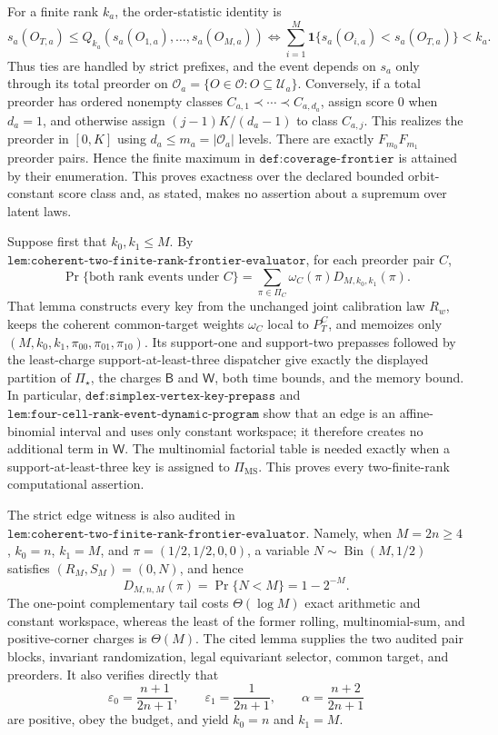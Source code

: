 For a finite rank \(k_a\), the order-statistic identity is
\[
s_a(O_{T,a})\le Q_{k_a}(s_a(O_{1,a}),\ldots,s_a(O_{M,a}))
\iff
\sum_{i=1}^M\mathbf 1\{s_a(O_{i,a})<s_a(O_{T,a})\}<k_a.
\tag{1}
\]
Thus ties are handled by strict prefixes, and the event depends on \(s_a\) only through its total preorder on \(\mathcal O_a=\{O\in\mathcal O:O\subseteq\mathcal U_a\}\). Conversely, if a total preorder has ordered nonempty classes \(C_{a,1}\prec\cdots\prec C_{a,d_a}\), assign score \(0\) when \(d_a=1\), and otherwise assign \((j-1)K/(d_a-1)\) to class \(C_{a,j}\). This realizes the preorder in \([0,K]\) using \(d_a\le m_a=|\mathcal O_a|\) levels. There are exactly \(F_{m_0}F_{m_1}\) preorder pairs. Hence the finite maximum in \(\texttt{def:coverage-frontier}\) is attained by their enumeration. This proves exactness over the declared bounded orbit-constant score class and, as stated, makes no assertion about a supremum over latent laws.

Suppose first that \(k_0,k_1\le M\). By \(\texttt{lem:coherent-two-finite-rank-frontier-evaluator}\), for each preorder pair \(C\),
\[
\Pr\{\text{both rank events under }C\}=\sum_{\pi\in\Pi_C}\omega_C(\pi)D_{M,k_0,k_1}(\pi).
\tag{2}
\]
That lemma constructs every key from the unchanged joint calibration law \(R_w\), keeps the coherent common-target weights \(\omega_C\) local to \(P_T^C\), and memoizes only \((M,k_0,k_1,\pi_{00},\pi_{01},\pi_{10})\). Its support-one and support-two prepasses followed by the least-charge support-at-least-three dispatcher give exactly the displayed partition of \(\Pi_\star\), the charges \(\mathsf B\) and \(\mathsf W\), both time bounds, and the memory bound. In particular, \(\texttt{def:simplex-vertex-key-prepass}\) and \(\texttt{lem:four-cell-rank-event-dynamic-program}\) show that an edge is an affine-binomial interval and uses only constant workspace; it therefore creates no additional term in \(\mathsf W\). The multinomial factorial table is needed exactly when a support-at-least-three key is assigned to \(\Pi_{\mathrm{MS}}\). This proves every two-finite-rank computational assertion.

The strict edge witness is also audited in \(\texttt{lem:coherent-two-finite-rank-frontier-evaluator}\). Namely, when \(M=2n\ge4\), \(k_0=n\), \(k_1=M\), and \(\pi=(1/2,1/2,0,0)\), a variable \(N\sim\operatorname{Bin}(M,1/2)\) satisfies \((R_M,S_M)=(0,N)\), and hence
\[
D_{M,n,M}(\pi)=\Pr\{N<M\}=1-2^{-M}.
\tag{3}
\]
The one-point complementary tail costs \(\Theta(\log M)\) exact arithmetic and constant workspace, whereas the least of the former rolling, multinomial-sum, and positive-corner charges is \(\Theta(M)\). The cited lemma supplies the two audited pair blocks, invariant randomization, legal equivariant selector, common target, and preorders. It also verifies directly that
\[
\varepsilon_0=\frac{n+1}{2n+1},\qquad \varepsilon_1=\frac1{2n+1},\qquad \alpha=\frac{n+2}{2n+1}
\tag{4}
\]
are positive, obey the budget, and yield \(k_0=n\) and \(k_1=M\).

